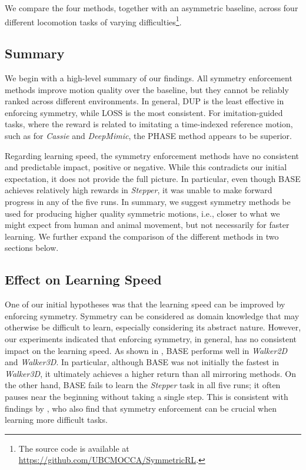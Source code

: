 We compare the four methods, together with an asymmetric baseline, across four different 
locomotion tasks of varying difficulties\footnote{The source code is available at \url{https://github.com/UBCMOCCA/SymmetricRL}.}.

\subsection{Summary}

We begin with a high-level summary of our findings.  All symmetry enforcement methods improve motion quality over the baseline, but they cannot be reliably ranked across different environments.  In general, DUP is the least effective in enforcing symmetry, while LOSS is the most consistent.  For imitation-guided tasks, where the reward is related to imitating a time-indexed reference motion, such as for \textit{Cassie} and \textit{DeepMimic}, the PHASE method appears to be superior.  

Regarding learning speed, the symmetry enforcement methods have no consistent and predictable impact, positive or negative.  While this contradicts our initial expectation, it does not provide the full picture.  In particular, even though BASE achieves relatively high rewards in \textit{Stepper}, it was unable to make forward progress in any of the five runs.  In summary, we suggest symmetry methods be used for producing higher quality symmetric motions, i.e., closer to what we might expect from human and animal movement, but not necessarily for faster learning.  We further expand the comparison of the different methods in two sections below.

\subsection{Effect on Learning Speed}

One of our initial hypotheses was that the learning speed can be improved by enforcing symmetry.  
Symmetry can be considered as domain knowledge that may otherwise be difficult to learn, 
especially considering its abstract nature.  
However, our experiments indicated that enforcing symmetry, in general, has no consistent impact on the learning speed.
As shown in , BASE performs well in \textit{Walker2D} and \textit{Walker3D}.  
In particular, although BASE was not initially the fastest in \textit{Walker3D}, 
it ultimately achieves a higher return than all mirroring methods.  
On the other hand, BASE fails to learn the \textit{Stepper} task in all five runs;
it often pauses near the beginning without taking a single step.  
This is consistent with findings by \citeauthor{Yu-SIGGRAPH-2018}, 
who also find that symmetry enforcement can be crucial when learning more difficult tasks.

